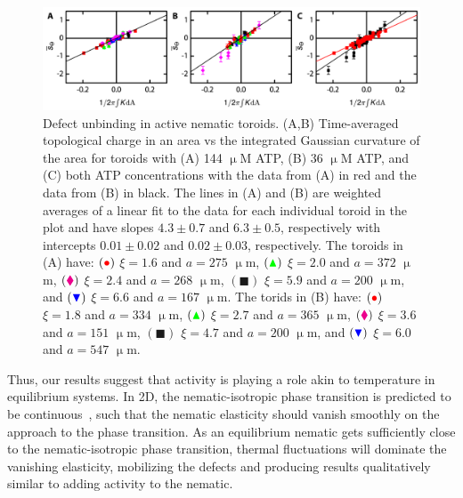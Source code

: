 \begin{figure}
  \centering
  \includegraphics{figures/C3/Ch3-Figs_DefectUnbinding.png}
  \caption{Defect unbinding in active nematic toroids.
  (A,B) Time-averaged topological charge in an area vs the integrated Gaussian curvature of the area for toroids with (A) 144 $\upmu$M ATP, (B) 36 $\upmu$M ATP, and (C) both ATP concentrations with the data from (A) in red and the data from (B) in black.
  The lines in (A) and (B) are weighted averages of a linear fit to the data for each individual toroid in the plot and have slopes $4.3 \pm 0.7$ and $6.3 \pm 0.5$, respectively with intercepts $0.01 \pm 0.02$ and $0.02 \pm 0.03$, respectively.
  The toroids in (A) have:
  $({\color{red} \bullet})$ $\xi = 1.6 $ and $a = 275$ $\upmu$m,
  $({\color{green} \blacktriangle})$ $\xi = 2.0 $ and $a = 372$ $\upmu$m,
  $({\color{magenta} \blacklozenge})$ $\xi = 2.4 $ and $a = 268$ $\upmu$m,
  $({\blacksquare})$ $\xi = 5.9$ and $a = 200$ $\upmu$m, and
  $({\color{blue} \blacktriangledown})$ $\xi = 6.6$ and $a = 167$ $\upmu$m.
  The torids in (B) have:
  $({\color{red} \bullet})$ $\xi = 1.8 $ and $a = 334$ $\upmu$m,
  $({\color{green} \blacktriangle})$ $\xi = 2.7 $ and $a = 365$ $\upmu$m,
  $({\color{magenta} \blacklozenge})$ $\xi = 3.6 $ and $a = 151$ $\upmu$m,
  $({\blacksquare})$ $\xi = 4.7$ and $a = 200$ $\upmu$m, and
  $({\color{blue} \blacktriangledown})$ $\xi = 6.0$ and $a = 547$ $\upmu$m.}\label{f:3-DefectUnbinding}
\end{figure}

Thus, our results suggest that activity is playing a role akin to temperature in equilibrium systems.
In 2D, the  nematic-isotropic phase transition is predicted to be continuous~\cite{RN172}, such that the nematic elasticity should vanish smoothly on the approach to the phase transition.
As an equilibrium nematic gets sufficiently close to the nematic-isotropic phase transition, thermal fluctuations will dominate the vanishing elasticity, mobilizing the defects and producing results qualitatively similar to adding activity to the nematic.




